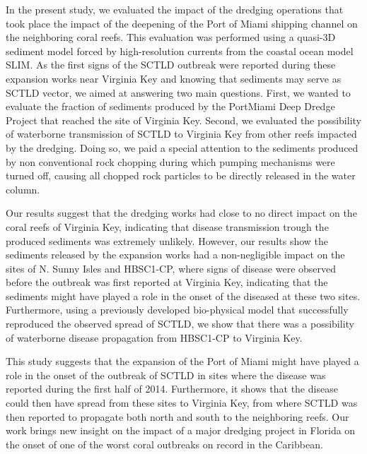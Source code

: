 \documentclass[preprint,12pt,authoryear]{elsarticle}
\begin{document}
In the present study, we evaluated the impact of the dredging operations that took place the impact of the deepening of the Port of Miami shipping channel on the neighboring coral reefs. This evaluation was performed using a quasi-3D sediment model forced by high-resolution currents from the coastal ocean model SLIM. As the first signs of the SCTLD outbreak were reported during these expansion works near Virginia Key and knowing that sediments may serve as SCTLD vector, we aimed at answering two main questions. First, we wanted to evaluate the fraction of sediments produced by the PortMiami Deep Dredge Project that reached the site of Virginia Key. Second, we evaluated the possibility of waterborne transmission of SCTLD to Virginia Key from other reefs impacted by the dredging. Doing so, we paid a special attention to the sediments produced by non conventional rock chopping during which pumping mechanisms were turned off, causing all chopped rock particles to be directly released in the water column.

Our results suggest that the dredging works had close to no direct impact on the coral reefs of Virginia Key, indicating that disease transmission trough the produced sediments was extremely unlikely. However, our results show the sediments released by the expansion works had a non-negligible impact on the sites of N. Sunny Isles and HBSC1-CP, where signs of disease were observed before the outbreak was first reported at Virginia Key, indicating that the sediments might have played a role in the onset of the diseased at these two sites. Furthermore, using a previously developed bio-physical model that successfully reproduced the observed spread of SCTLD, we show that there was a possibility of waterborne disease propagation from HBSC1-CP to Virginia Key.

This study suggests that the expansion of the Port of Miami might have played a role in the onset of the outbreak of SCTLD in sites where the disease was reported during the first half of 2014. Furthermore, it shows that the disease could then have spread from these sites to Virginia Key, from where SCTLD was then reported to propagate both north and south to the neighboring reefs. Our work brings new insight on the impact of a major dredging project in Florida on the onset of one of the worst coral outbreaks on record in the Caribbean.

 

\end{document}
